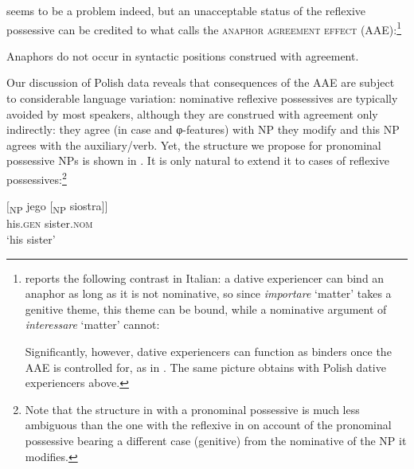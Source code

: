 \documentclass[output=paper,modfonts,nonflat
]{langsci/langscibook}
\begin{document}
 seems to be a problem indeed, but an unacceptable status of the reflexive possessive can be credited to what \cite[26]{rizzi1990} calls the \textsc{anaphor agreement effect} (AAE):\footnote{\cite[32--33]{rizzi1990} reports the following contrast in Italian: a dative experiencer can bind an anaphor as long as it is not nominative, so since \textit{importare} ‘matter’ takes a genitive theme, this theme can be bound, while a nominative argument of \textit{interessare} ‘matter’ cannot:

\z

\z
                        
\noindent Significantly, however, dative experiencers can function as binders once the AAE is controlled for, as in . The same picture obtains with Polish dative experiencers above.}

\ea \label{ex:witkos:53}
Anaphors do not occur in syntactic positions construed with agreement.\\
\z


Our discussion of Polish data reveals that consequences of the AAE are subject to considerable language variation: nominative reflexive possessives are typically avoided by most speakers, although they are construed with agreement only indirectly: they agree (in case and φ-features) with NP they modify and this NP agrees with the auxiliary/verb. Yet, the structure we propose for pronominal possessive NPs is shown in . It is only natural to extend it to cases of reflexive possessives:\footnote{\label{fn29}Note that the structure in  with a pronominal possessive is much less ambiguous than the one with the reflexive in  on account of the pronominal possessive bearing a different case (genitive) from the nominative of the NP it modifies.} 

\ea \label{ex:witkos:57}{
\gll $[$\textsubscript{NP} jego [\textsubscript{NP}  siostra$]]$\\
     {} his.\textsc{gen} {} sister.\textsc{nom}\\
\glt `his sister'
}
\z
\end{document}
